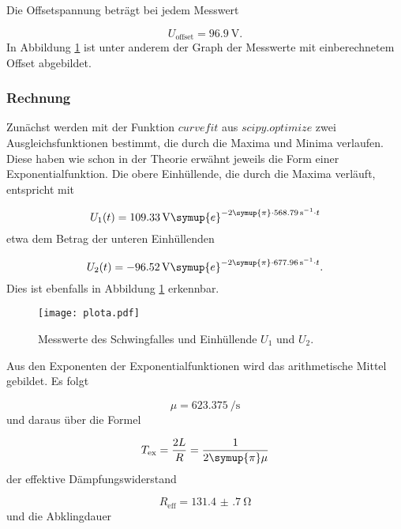 Die Offsetspannung beträgt bei jedem Messwert

\begin{equation}
  U_\text{offset} = \SI{96.9}{\V}.
\end{equation}
In Abbildung \ref{fig:Schwingfall} ist unter anderem der Graph der Messwerte
mit einberechnetem Offset abgebildet.

\subsubsection{Rechnung}

Zunächst werden mit der Funktion $curvefit$ aus $scipy.optimize$ zwei
Ausgleichsfunktionen bestimmt, die durch die Maxima und Minima
verlaufen. Diese haben wie schon in der Theorie erwähnt jeweils die Form einer
Exponentialfunktion.
Die obere Einhüllende, die durch die Maxima verläuft, entspricht mit

\begin{equation}
  U_1(t) = \SI{109.33}{\V} \symup{e}^{-2\symup{\pi} \cdot
  \SI{568.79}{\per\second} \cdot t}
\end{equation}
etwa dem Betrag der unteren Einhüllenden

\begin{equation}
  U_2(t) = \SI{-96.52}{\V} \symup{e}^{-2\symup{\pi} \cdot
  \SI{677.96}{\per\second} \cdot t}.
\end{equation}
Dies ist ebenfalls in Abbildung \ref{fig:Schwingfall} erkennbar.

\begin{figure}[h]
  \centering
  \texttt{[image: plota.pdf]}
  \caption{Messwerte des Schwingfalles und Einhüllende $U_1$ und $U_2$.}
  \label{fig:Schwingfall}
\end{figure}

Aus den Exponenten der Exponentialfunktionen wird das arithmetische Mittel
gebildet. Es folgt

\begin{equation}
  \mu = \SI{623.375}{\per\second}
\end{equation}
und daraus über die Formel

\begin{equation}
  T_\text{ex} = \frac{2L}{R} = \frac{1}{2\symup{\pi}\mu}
\end{equation}
der effektive Dämpfungswiderstand

\begin{equation}
  R_\text{eff} = \SI{131.4(7)}{\ohm}
\end{equation}
und die Abklingdauer

